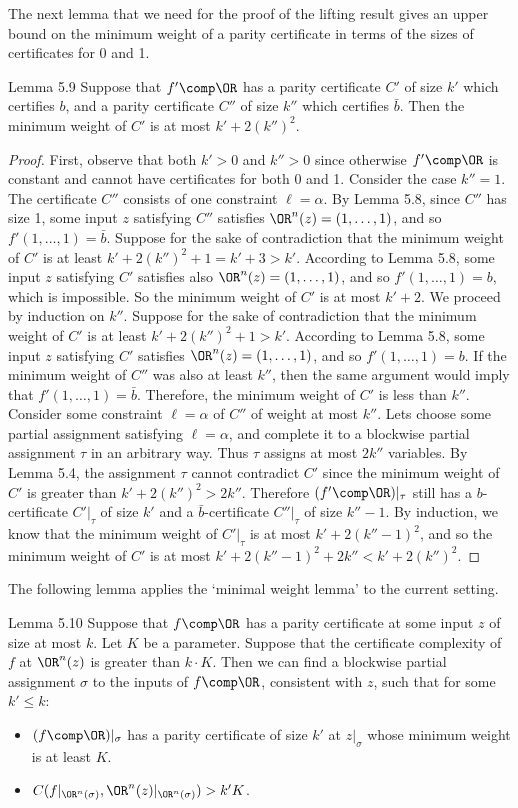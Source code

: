 The next lemma that we need for the proof of the lifting result gives an upper bound on the minimum weight of a parity certificate in terms of the sizes of certificates for 0 and 1.
\begin{originalresult}{Lemma 5.9}
Suppose that $f'\comp\OR$ has a parity certificate $C'$ of size $k'$ which certifies $b$, and a parity certificate $C''$ of size $k''$ which certifies $\bar b$. Then the minimum weight of $C'$ is at most $k'+2(k'')^2$.
\end{originalresult}
\begin{proof}
First, observe that both $k'>0$ and $k''>0$ since otherwise $f'\comp\OR$ is constant and cannot have certificates for both 0 and 1.
Consider the case $k''=1$. The certificate $C''$ consists of one constraint $\ell=\alpha$. By Lemma 5.8, since $C''$ has size 1, some input $z$ satisfying $C''$ satisfies $\OR^n(z)=(1,\ldots,1)$, and so $f'(1,\ldots,1)=\bar b$. Suppose for the sake of contradiction that the minimum weight of $C'$ is at least $k'+2(k'')^2+1=k'+3>k'$. According to Lemma 5.8, some input $z$ satisfying $C'$ satisfies also $\OR^n(z)=(1,\ldots,1)$, and so $f'(1,\ldots,1)=b$, which is impossible. So the minimum weight of $C'$ is at most $k'+2$.
We proceed by induction on $k''$. Suppose for the sake of contradiction that the minimum weight of $C'$ is at least $k'+2(k'')^2+1>k'$. According to Lemma 5.8, some input $z$ satisfying $C'$ satisfies $\OR^n(z)=(1,\ldots,1)$, and so $f'(1,\ldots,1)=b$. If the minimum weight of $C''$ was also at least $k''$, then the same argument would imply that $f'(1,\ldots,1)=\bar b$. Therefore, the minimum weight of $C'$ is less than $k''$. Consider some constraint $\ell=\alpha$ of $C''$ of weight at most $k''$. Lets choose some partial assignment satisfying $\ell=\alpha$, and complete it to a blockwise partial assignment $\tau$ in an arbitrary way. Thus $\tau$ assigns at most $2k''$ variables. By Lemma 5.4, the assignment $\tau$ cannot contradict $C'$ since the minimum weight of $C'$ is greater than $k'+2(k'')^2>2k''$. Therefore $(f'\comp\OR)|_\tau$ still has a $b$-certificate $C'|_\tau$ of size $k'$ and a $\bar b$-certificate $C''|_\tau$ of size $k''-1$. By induction, we know that the minimum weight of $C'|_\tau$ is at most $k'+2(k''-1)^2$, and so the minimum weight of $C'$ is at most $k'+2(k''-1)^2+2k''<k'+2(k'')^2$.
\end{proof}
The following lemma applies the `minimal weight lemma' to the current setting.
\begin{originalresult}{Lemma 5.10}
Suppose that $f\comp\OR$ has a parity certificate at some input $z$ of size at most $k$. Let $K$ be a parameter. Suppose that the certificate complexity of $f$ at $\OR^n(z)$ is greater than $k\cdot K$. Then we can find a blockwise partial assignment $\sigma$ to the inputs of $f\comp\OR$, consistent with $z$, such that for some $k'\le k$:
\begin{itemize}
\item $(f\comp\OR)|_\sigma$ has a parity certificate of size $k'$ at $z|_\sigma$ whose minimum weight is at least $K$.
\item $C(f|_{\OR^n(\sigma)},\OR^n(z)|_{\OR^n(\sigma)})>k'K$.
\end{itemize}
\end{originalresult}
